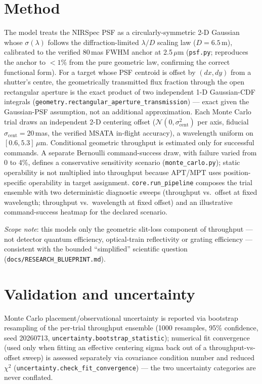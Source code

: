 \documentclass[11pt]{article}
\begin{document}
\section{Method}
\label{sec:method}
The model treats the NIRSpec PSF as a circularly-symmetric 2-D Gaussian
whose $\sigma(\lambda)$ follows the diffraction-limited $\lambda/D$ scaling
law ($D=6.5$\,m), calibrated to the verified 80\,mas FWHM anchor at
2.5\,$\mu$m (\texttt{psf.py}; reproduces the anchor to $<1\%$ from the pure
geometric law, confirming the correct functional form). For a target whose
PSF centroid is offset by $(dx, dy)$ from a shutter's centre, the
geometrically transmitted flux fraction through the open rectangular
aperture is the exact product of two independent 1-D Gaussian-CDF integrals
(\texttt{geometry.rectangular\_aperture\_transmission}) --- exact given the
Gaussian-PSF assumption, not an additional approximation. Each Monte Carlo
trial draws an independent 2-D centering offset
($\mathcal{N}(0,\sigma_{\mathrm{cent}}^2)$ per axis, fiducial
$\sigma_{\mathrm{cent}}=20$\,mas, the verified MSATA in-flight accuracy), a
wavelength uniform on $[0.6, 5.3]\,\mu$m. Conditional geometric throughput is
estimated only for successful commands. A separate Bernoulli command-success
draw, with failure varied from 0 to 4\%, defines a conservative sensitivity
scenario (\texttt{monte\_carlo.py}); static operability is not multiplied into
throughput because APT/MPT uses position-specific operability in target
assignment. \texttt{core.run\_pipeline} composes the trial
ensemble with two deterministic diagnostic sweeps (throughput vs.\ offset at
fixed wavelength; throughput vs.\ wavelength at fixed offset) and an
illustrative command-success heatmap for the declared scenario.

\emph{Scope note}: this models only the geometric slit-loss component of
throughput --- not detector quantum efficiency, optical-train reflectivity or
grating efficiency --- consistent with the bounded ``simplified'' scientific
question (\texttt{docs/RESEARCH\_BLUEPRINT.md}).

\section{Validation and uncertainty}
\label{sec:validation}
Monte Carlo placement/observational uncertainty is reported via bootstrap
resampling of the per-trial throughput ensemble (1000 resamples, 95\%
confidence, seed 20260713, \texttt{uncertainty.bootstrap\_statistic});
numerical fit convergence (used only when fitting an effective centering
sigma back out of a throughput-vs-offset sweep) is assessed separately via
covariance condition number and reduced $\chi^2$
(\texttt{uncertainty.check\_fit\_convergence}) --- the two uncertainty
categories are never conflated.
\end{document}
